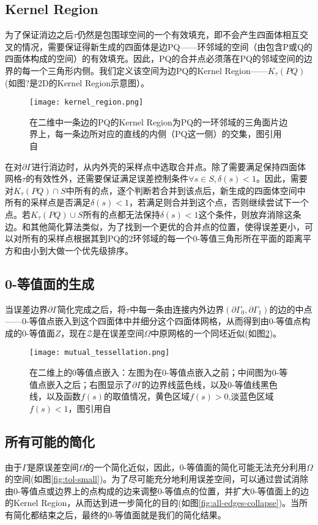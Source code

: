 \subsection{Kernel Region}
为了保证消边之后$\tau$仍然是包围球空间的一个有效填充，即不会产生四面体相互交叉的情况，需要保证得新生成的四面体是边PQ——环邻域的空间（由包含P或Q的四面体构成的空间）的有效填充。因此，PQ的合并点必须落在PQ的邻域空间的边界的每一个三角形内侧。我们定义该空间为边PQ的Kernel Region——$K_\tau(PQ)$(如图?是2D的Kernel Region示意图）。
\begin{figure}[htbp]
    \centering
    \texttt{[image: kernel\_region.png]}
    \caption{在二维中一条边的PQ的Kernel Region为PQ的一环邻域的三角面片边界上，每一条边所对应的直线的内侧（PQ这一侧）的交集，图引用自\cite{isotopic-appro}}
    \label{fig:kernel-region}
\end{figure}
\par 在对$\partial \Gamma$进行消边时，从内外壳的采样点中选取合并点。除了需要满足保持四面体网格$\tau$的有效性外，还需要保证满足误差控制条件$\forall s \in S, \delta(s) < 1$。因此，需要对$K_\tau (PQ) \cap S$中所有的点，逐个判断若合并到该点后，新生成的四面体空间中所有的采样点是否满足$\delta(s) < 1$，若满足则合并到这个点，否则继续尝试下一个点。若$K_\tau (PQ) \cup S$所有的点都无法保持$\delta(s) < 1$这个条件，则放弃消除这条边。和其他简化算法类似，为了找到一个更优的合并点的位置，使得误差更小，可以对所有的采样点根据其到PQ的2环邻域的每一个0-等值三角形所在平面的距离平方和由小到大做一个优先级排序。
\subsection{0-等值面的生成}
当误差边界$\partial \Gamma$简化完成之后，将$\tau$中每一条由连接内外边界$(\partial \Gamma_0, \partial \Gamma_1)$的边的中点——0-等值点嵌入到这个四面体中并细分这个四面体网格，从而得到由0-等值点构成的0-等值面$\mathcal{Ζ}$，现在$\mathcal{Z}$是在误差空间$\Omega$中原网格的一个同坯近似(如图\ref{fig:mutual-tessellation})。
\begin{figure}[htbp]
    \centering
    \texttt{[image: mutual\_tessellation.png]}
    \caption{在二维上的0等值点嵌入：左图为在0-等值点嵌入之前；中间图为0-等值点嵌入之后；右图显示了$\partial \Gamma$的边界线蓝色线，以及0-等值线黑色线，以及函数$f(s)$的取值情况，黄色区域$f(s) > 0$,淡蓝色区域$f(s) < 1$，图引用自\cite{isotopic-appro}}
    \label{fig:mutual-tessellation}
\end{figure}

\subsection{所有可能的简化}
由于$\Gamma$是原误差空间$\Omega$的一个简化近似，因此，0-等值面的简化可能无法充分利用$\Omega$的空间(如图\ref{fig:tol-small})。为了尽可能充分地利用误差空间，可以通过尝试消除由0-等值点或边界上的点构成的边来调整0-等值点的位置，并扩大0-等值面上的边的Kernel Region，从而达到进一步简化的目的(如图\ref{fig:all-edges-collapse})。当所有简化都结束之后，最终的0-等值面就是我们的简化结果。

